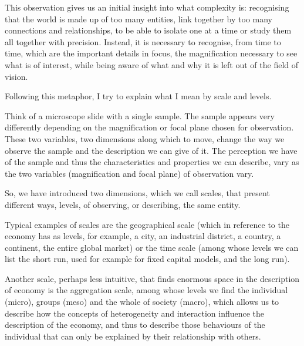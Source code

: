 \documentclass[a4paper, headings=standardclasses]{scrartcl}
\begin{document}
This observation gives us an initial insight into what complexity is: recognising that the world is made up of too many entities, link together by too many connections and relationships, to be able to isolate one at a time or study them all together with precision. Instead, it is necessary to recognise, from time to time, which are the important details in focus, the magnification necessary to see what is of interest, while being aware of what and why it is left out of the field of vision.

Following this metaphor, I try to explain what I mean by scale and levels.

Think of a microscope slide with a single sample. The sample appears very differently depending on the magnification or focal plane chosen for observation.
These two variables, two dimensions along which to move, change the way we observe the sample and the description we can give of it.
The perception we have of the sample and thus the characteristics and properties we can describe, vary as the two variables (magnification and focal plane) of observation vary.

So, we have introduced two dimensions, which we call scales, that present different ways, levels, of observing, or describing, the same entity.

Typical examples of scales are the geographical scale (which in reference to the economy has as levels, for example, a city, an industrial district, a country, a continent, the entire
global market) or the time scale (among whose levels we can list the short run, used for example for fixed capital models, and the long run).

Another scale, perhaps less intuitive, that finds enormous space in the description of economy is the aggregation scale, among whose levels we find the individual (micro), groups (meso) and the whole of society (macro), which allows us to describe how the concepts of heterogeneity and interaction influence the description of the economy, and thus to describe those behaviours of the individual that can only be explained by their relationship with others.
\end{document}
